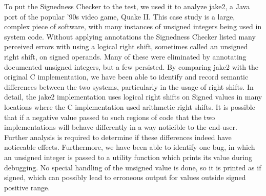 \documentclass{sig-alternate-05-2015}
\begin{document}
To put the Signedness Checker to the test, we used it to analyze jake2, a Java port of the popular '90s video game, Quake II. This case study is a large, complex piece of software, with many instances of unsigned integers being used in system code. Without applying annotations the Signedness Checker listed many perceived errors with using a logical right shift, sometimes called an unsigned right shift, on signed operands. Many of these were eliminated by annotating documented unsigned integers, but a few persisted. By comparing jake2 with the original C implementation, we have been able to identify and record semantic differences between the two systems, particularly in the usage of right shifts. In detail, the jake2 implementation uses logical right shifts on Signed values in many locations where the C implementation used arithmetic right shifts. It is possible that if a negative value passed to such regions of code that the two implementations will behave differently in a way noticible to the end-user. Further analysis is required to determine if these differences indeed have noticeable effects. Furthermore, we have been able to identify one bug, in which an unsigned integer is passed to a utility function which prints its value during debugging. No special handling of the unsigned value is done, so it is printed as if signed, which can possibly lead to erroneous output for values outside signed positive range.



\end{document}
